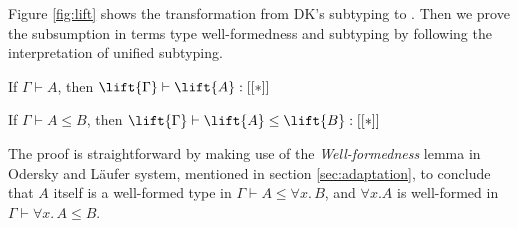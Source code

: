 Figure \ref{fig:lift} shows the transformation from DK's subtyping to \name.
Then we prove the subsumption in terms type well-formedness and subtyping
by following the interpretation of unified subtyping.

\begin{theorem}
    If $\Gamma \vdash A$, then $\lift{\Gamma} \vdash \lift{A} : [[*]]$
\end{theorem}

\begin{theorem}
    If $\Gamma \vdash A \le B$, then $\lift{\Gamma} \vdash \lift{A} \le \lift{B} : [[*]]$
\end{theorem}

The proof is straightforward by making use of the \emph{Well-formedness} lemma
in Odersky and L\"aufer system, mentioned in section \ref{sec:adaptation}, to conclude that
$A$ itself is a well-formed type in $\Gamma \vdash A \le \forall x.\, B$, and
$\forall x. A$ is well-formed in $\Gamma \vdash \forall x. \, A \le B$.


